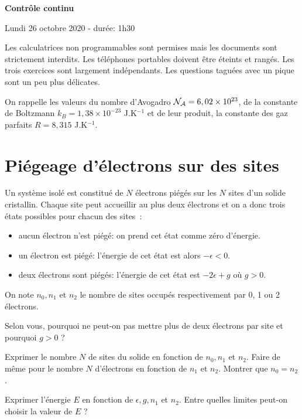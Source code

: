 \documentclass[utf8, 11pt]{feuille}
\begin{document}
\begin{center}
    \Large {\bf Contrôle continu}
    
    Lundi 26 octobre 2020 - durée: 1h30
\end{center}

Les calculatrices non programmables sont permises mais les documents sont strictement interdits.
Les téléphones portables doivent être éteints et rangés. Les trois exercices sont largement indépendants. Les questions taguées avec un pique sont un peu plus délicates.

\medskip

On rappelle les valeurs du nombre d'Avogadro ${\cal N_A}=6,02 \times 10^{23}$, de la constante de Boltzmann $k_B=1,38 \times 10^{-23}$ J.K$^{-1}$ et de leur produit, la constante des gaz parfaits $R=8,315$ J.K$^{-1}$. 



\section{Piégeage d'électrons sur des sites}

Un système isolé est constitué de $N$ électrons piégés sur les $N$ sites d'un solide cristallin. Chaque site peut accueillir au plus deux électrons et on a donc trois états possibles pour chacun des sites~:

\begin{itemize}
\item aucun électron n'est piégé: on prend cet état comme zéro d'énergie.
\item un électron est piégé: l'énergie de cet état est alors $-\epsilon<0$.
\item deux électrons sont piégés: l'énergie de cet état est $-2\epsilon+g$ où $g>0$. 
\end{itemize}

On note $n_0, n_1$ et $n_2$ le nombre de sites occupés respectivement par 0, 1 ou 2 électrons.

\question
Selon vous, pourquoi ne peut-on pas mettre plus de deux électrons par site et pourquoi $g>0$ ?

\question
Exprimer le nombre $N$ de sites du solide en fonction de $n_0, n_1$ et $n_2$. Faire de même pour le nombre $N$ d'électrons en fonction de $n_1$ et $n_2$. Montrer que $n_0=n_2$.

\question
Exprimer l'énergie $E$ en fonction de $\epsilon, g, n_1$ et $n_2$. Entre quelles limites peut-on choisir la valeur de $E$ ?
\end{document}
